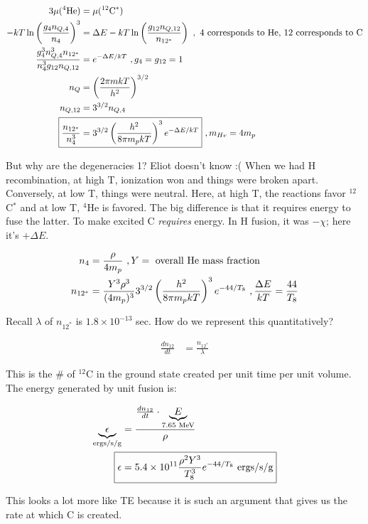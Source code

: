 \begin{align}
3\mu(^4\textrm{He}) &= \mu(^{12}\textrm{C}^*)\\
-kT\ln \lp \frac{g_4 n_{Q,4}}{n_4} \rp^3 &= \Delta E - kT \ln \lp \frac{g_{12}n_{Q,12}}{n_{12^*}} \rp~,\textrm{ 4 corresponds to He, 12 corresponds to C}\\
\frac{g_4^3 n_{Q,4}^3 n_{12^*}}{n_4^3 g_{12} n_{Q,12}} &= e^{-\Delta E /kT}~,g_4 = g_{12} = 1\\
n_Q &= \lp \frac{2 \pi mkT}{h^2} \rp^{3/2}\\
n_{Q,12} &= 3^{3/2}n_{Q,4}\\
\Aboxed{\frac{n_{12^*}}{n_4^3} &= 3^{3/2} \lp \frac{h^2}{8 \pi m_p kT} \rp^3 e^{-\Delta E/kT}}~, m_{He} = 4m_p
\end{align}

But why are the degeneracies 1? Eliot doesn't know :( When we had H recombination, at high T, ionization won and things were broken apart. Conversely, at low T, things were neutral. Here, at high T, the reactions favor $^{12}$C$^*$ and at low T, $^4$He is favored. The big difference is that it requires energy to fuse the latter. To make excited C \textit{requires} energy. In H fusion, it was $-\chi$; here it's $+\Delta E$. 

\begin{align}
n_4 &= \frac{\rho}{4m_p}~,Y = \textrm{ overall He mass fraction}\\
n_{12^*} &=\frac{Y^3 \rho^3}{(4m_p)^3}3^{3/2} \left( \frac{h^2}{8 \pi m_p kT} \right)^3 e^{-44/T_8}~,\frac{\Delta E}{kT} = \frac{44}{T_8}
\end{align}

Recall $\lambda$ of $n_{12^*}$ is $1.8 \times 10^{-13}$ sec. How do we represent this quantitatively? 

\begin{align}
\frac{dn_{12}}{dt} &= \frac{n_{12^*}}{\lambda}
\end{align}

This is the \# of $^{12}$C in the ground state created per unit time per unit volume. The energy generated by unit fusion is:

\begin{align}
\underbrace{\epsilon}_{\textrm{ergs/s/g}} &= \frac{\frac{dn_{12}}{dt} \cdot \underbrace{E}_{7.65\textrm{ MeV}}}{\rho}\\
\Aboxed{\epsilon &= 5.4 \times 10^{11} \frac{\rho^2 Y^3}{T_8^3} e^{-44/T_8}\textrm{ ergs/s/g}}
\end{align}

This looks a lot more like TE because it is such an argument that gives us the rate at which C is created. 

